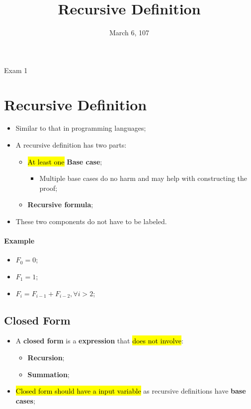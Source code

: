 \documentclass{note}
\date{March 6, 107}
\title{Recursive Definition}
\begin{document}
\begin{note}{Exam 1}

\section{Recursive Definition}

\begin{itemize}
    \item Similar to that in programming languages;
    \item A recursive definition has two parts:
    \begin{itemize}
        \item \hl{At least one} \textbf{Base case};
        \begin{itemize}
            \item Multiple base cases do no harm and may help with constructing the proof;
        \end{itemize}
        \item \textbf{Recursive formula};
    \end{itemize}
    \item These two components do not have to be labeled.
\end{itemize}

\paragraph{Example}

\begin{itemize}
    \item $ F_{0} = 0 $;
    \item $ F_{1} = 1 $;
    \item $ F_{i} = F_{i - 1} + F_{i - 2}, \forall i > 2 $;
\end{itemize}

    \subsection{Closed Form}

    \begin{itemize}
        \item A \textbf{closed form} is a \textbf{expression} that \hl{does not involve}:
        \begin{itemize}
            \item \textbf{Recursion};
            \item \textbf{Summation};
        \end{itemize}
        \item \hl{Closed form should have a input variable} as recursive definitions have \textbf{base cases};
    \end{itemize}


\end{note}
\end{document}
